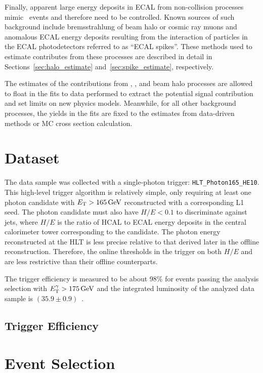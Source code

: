Finally, apparent large energy deposits in ECAL from non-collision processes mimic \gmet\ events and therefore need to be controlled. 
Known sources of such background include bremsstrahlung of beam halo or cosmic ray muons and anomalous ECAL energy deposits resulting from the interaction of particles in the ECAL photodetectors referred to as ``ECAL spikes''. 
These methods used to estimate contributes from these processes are described in detail in Sections~\ref{sec:halo_estimate} and~\ref{sec:spike_estimate}, respectively.

The estimates of the contributions from \zinvg, \wlng, and beam halo processes are allowed to float in the fits to data performed to extract the potential signal contribution and set limits on new physics models. %
Meanwhile, for all other background processes, the yields in the fits are fixed to the estimates from data-driven methods or MC cross section calculation. 
\section{Dataset}
\label{sec:dataset}

The data sample was collected with a single-photon trigger: \texttt{HLT\_Photon165\_HE10}.
This high-level trigger algorithm is relatively simple, only requiring at least one photon candidate with $E_{\mathrm{T}} > 165\,\text{Ge\hspace{-.08em}V}$ reconstructed with a corresponding L1 seed.
The photon candidate must also have $H/E < 0.1$ to discriminate against jets, where $H/E$ is the ratio of HCAL to ECAL energy deposits in the central calorimeter tower corresponding to the candidate.
The photon energy reconstructed at the HLT is less precise relative to that derived later in the offline reconstruction. 
Therefore, the online thresholds in the trigger on both $H/E$ and \ETg are less restrictive than their offline counterparts.

The trigger efficiency is measured to be about 98\% for events passing the analysis selection with $E_{\mathrm{T}}^{\gamma} > 175\,\text{Ge\hspace{-.08em}V}$ and the integrated luminosity of the analyzed data sample is $(35.9\pm0.9)$\fbinv~\cite{CMS:2017sdi}.

\subsection{Trigger Efficiency}
\label{sec:triggereff}



\section{Event Selection}
\label{sec:event_selection}

